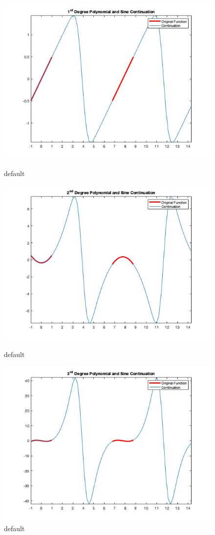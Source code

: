 \documentclass[11pt]{amsart}
\begin{document}
\begin{figure}[htbp]
\begin{center}
\includegraphics[scale=0.5]{FirstDegreeSineCont.jpg}
\caption{default}
\label{default}



\includegraphics[scale=0.5]{SecondDegreeSinCont.jpg}
\caption{default}
\label{default}



\includegraphics[scale=0.5]{ThirdDegreeSineCont.jpg}
\caption{default}
\label{default}





\end{center}
\end{figure}
\end{document}
